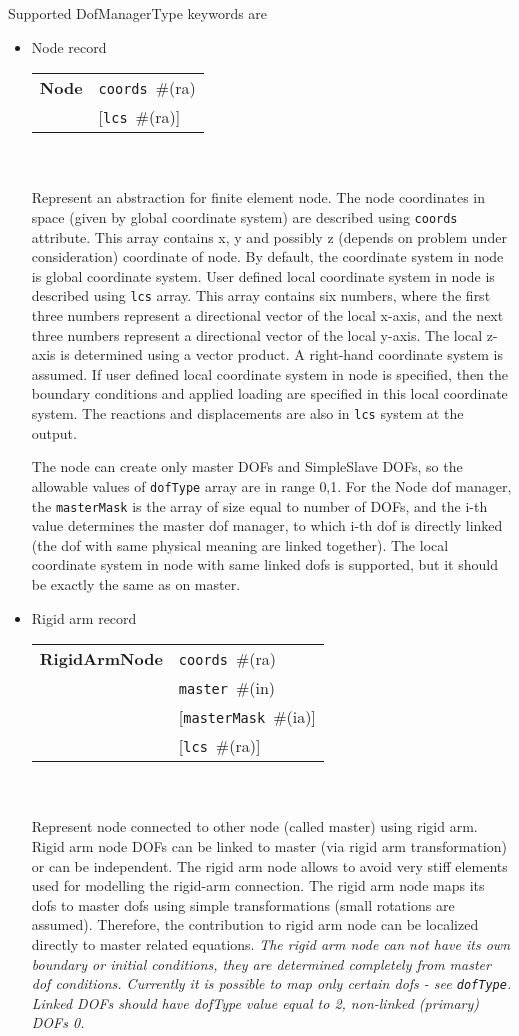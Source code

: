 \documentclass[a4paper]{report}
\newcommand{\param}[1]{\texttt{#1}} %
\newcommand{\optional}[1]{[#1]} %
\newcommand{\field}[2]{\param{#1}~\#{\tiny(#2)}} %
\newcommand{\optField}[2]{\optional{\field{#1}{#2}}}
\newcommand{\entKeywordInst}[1]{\textbf{#1}} %
\newenvironment{record}[1][]{\begin{tabular}{|ll}}{\end{tabular}\\}
\newcommand{\recentry}[2]{{#1}&{#2}\\}
\newcounter{rcc}
\newenvironment{record}[1][\textwidth]{\setcounter{rcc}{0}\rowcolors{1}{lightgray}{lightgray}\tabularx{#1}{llR} \hline}
               {\endtabularx}
\newcommand{\recentry}[2]{\ifthenelse{\value{rcc}>0}{$\backslash$ \\}{\setcounter{rcc}{1}}{#1}&{#2}&}
\begin{document}
Supported DofManagerType keywords are
\begin{itemize}
\item Node record

\begin{record}[0.9\textwidth]
  \recentry{\entKeywordInst{Node}}{\field{coords}{ra}}
  \recentry{}{[\field{lcs}{ra}]}
\end{record}\\
Represent an abstraction for finite element node.
The node coordinates in space (given by global coordinate system) are described
using \param{coords} attribute. This array contains x, y and possibly z
(depends on problem under consideration) coordinate of node.
By default, the coordinate system in node is global coordinate system.
User defined local coordinate system in node is described using \param{lcs} array. This
array contains six numbers, where the first three numbers represent
a directional vector of the local x-axis, and the next three numbers represent
a directional vector of the local y-axis. The local z-axis is determined
using a vector product. A right-hand coordinate system is assumed.
If user defined local coordinate system in node is specified, then the
boundary conditions and applied loading are specified in this local coordinate system.
The reactions and displacements are also in \param{lcs} system at the output.

The node can create only master DOFs and SimpleSlave DOFs, so the
allowable values of \param{dofType} array are in range {0,1}.
For the Node dof manager, the \param{masterMask} is the array of size
equal to number of DOFs, and the i-th value determines the
master dof manager, to which i-th dof is directly linked (the dof with
same physical meaning are linked together).
The local coordinate
system in node with same linked dofs is supported, but it should be exactly the
same as on master.


\item Rigid arm record

\begin{record}[0.9\textwidth]
  \recentry{\entKeywordInst{RigidArmNode}}{\field{coords}{ra}}
  \recentry{}{\field{master}{in}}
  \recentry{}{\optField{masterMask}{ia}}
  \recentry{}{[\field{lcs}{ra}]}
\end{record}\\
Represent node connected to other node (called master) using rigid
arm. Rigid arm node DOFs can be linked to master (via rigid arm transformation) or can be independent. The rigid arm node allows to avoid very
stiff elements used for modelling the rigid-arm connection.
The rigid arm node maps its dofs to master dofs using simple transformations
(small rotations are assumed). Therefore, the contribution to rigid
arm node can be localized directly to master related equations.
{\em The rigid arm node can not have its own boundary or initial conditions, they are
determined completely from master dof conditions. Currently it is
possible to map only certain dofs - see \param{dofType}. Linked DOFs
should have dofType value equal to 2, non-linked (primary) DOFs 0.}


\end{itemize}
\end{document}
